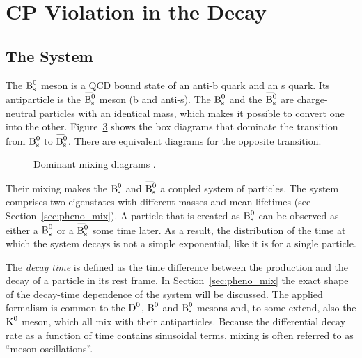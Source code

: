 \section{CP Violation in the \texorpdfstring{\BstoJpsiphi{}}{Bs0->Jpsiphi} Decay}
\label{sec:intro_Jpsiphi}

\subsection{The \texorpdfstring{\BsBsbar{}}{Bs0-Bs0bar} System}
\label{subsec:intro_Jpsiphi_Bs}

The $\text{B}_\text{s}^\text{0}$ meson is a QCD bound state of an anti-b quark and an s quark. Its antiparticle is the $\Bsbar$ meson (b and anti-s). The $\text{B}_\text{s}^\text{0}$
and the $\Bsbar$ are charge-neutral particles with an identical mass, which makes it possible to convert one into the other.
Figure~\ref{fig:mixing} shows the box diagrams that dominate the transition from $\text{B}_\text{s}^\text{0}$ to $\Bsbar$. There are equivalent diagrams for the
opposite transition.
\begin{figure}[hbt]
  \centering
  \begin{subfigure}{0.5\textwidth}
    \centering
    
    \label{fig:mixing_1}
  \end{subfigure}%
  \begin{subfigure}{0.5\textwidth}
    \centering
    
    \label{fig:mixing_2}
  \end{subfigure}
  \caption{Dominant \BsBsbar{} mixing diagrams \cite{LHCb-PAPER-2013-002}.}
  \label{fig:mixing}
\end{figure}

Their mixing makes the $\text{B}_\text{s}^\text{0}$ and $\Bsbar$ a coupled system of particles. The system comprises two eigenstates with different masses and
mean lifetimes (see Section~\ref{sec:pheno_mix}). A particle that is created as $\text{B}_\text{s}^\text{0}$ can be observed as either a $\text{B}_\text{s}^\text{0}$ or a $\Bsbar$ some
time later. As a result, the distribution of the time at which the \BsBsbar{} system decays is not a simple exponential, like it is for a
single particle.

The \emph{decay time} is defined as the time difference between the production and the decay of a particle in its rest frame. In
Section~\ref{sec:pheno_mix} the exact shape of the decay-time dependence of the \BsBsbar{} system will be discussed. The applied formalism
is common to the $\text{D}^\text{0}$, $\text{B}^\text{0}$ and $\text{B}_\text{s}^\text{0}$ mesons and, to some extend, also the $\text{K}^\text{0}$ meson, which all mix with their antiparticles.
Because the differential decay rate as a function of time contains sinusoidal terms, mixing is often referred to as ``meson oscillations''.

